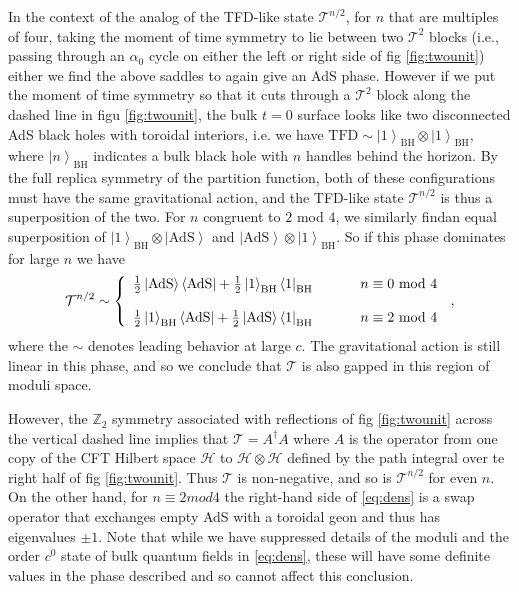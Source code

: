 \documentclass[letterpaper,12pt]{article}
\newcommand{\ban}[1]{\begin{align}#1\end{align}}
\newcommand{\ket}[1]{\left| #1\right>}
\newcommand{\bra}[1]{\left< #1\right|}
\begin{document}
In the context of the analog of the TFD-like state $\mathcal T^{n/2}$, for $n$ that are multiples of four, taking the moment of time symmetry to lie between two $\mathcal T^2$ blocks (i.e., passing through an $\alpha_0$ cycle on either the left or right side of fig \ref{fig:twounit}) either we find the above saddles to again give an AdS phase. However if we put the moment of time symmetry so that it cuts through a $\mathcal T^2$ block along the dashed line in figu \ref{fig:twounit}, the bulk $t=0$ surface looks like two disconnected AdS black holes with toroidal interiors, i.e. we have $\text{TFD} \sim \ket 1_\text{BH}\otimes \ket 1_\text{BH}$, where $\ket{n}_\text{BH}$ indicates a bulk black hole with $n$ handles behind the horizon. By the full replica symmetry of the partition function, both of these configurations must have the same gravitational action, and the TFD-like state $\mathcal T^{n/2}$ is thus a superposition of the two. For  $n$ congruent to $2$ mod $4$, we similarly findan equal superposition of $\ket 1_\text{BH} \otimes \ket{\text{AdS}}$ and $\ket{\text{AdS}}\otimes \ket 1_\text{BH} $. So if this phase dominates for large $n$ we have
\ban{
\mathcal T^{n/2}\sim \left \{ \begin{array}{ccc} \frac 12 \ket{\text{AdS}}\bra{\text{AdS}}+\frac 12 \ket 1 _\text{BH} \bra 1_\text{BH}& \hspace{0.5cm} & n \equiv 0 \text{ mod } 4 \\
\\
\frac 12 \ket{1}_\text{BH} \bra{\text{AdS}}+\frac 12 \ket{\text{AdS}} \bra 1_\text{BH} & \hspace{0.5cm}& n \equiv 2 \text{ mod } 4
\end{array}
 \right. \, \label{eq:dens},
}
where the $\sim$ denotes leading behavior at large $c$.
The gravitational action is still linear in this phase, and so we conclude that $\mathcal T$ is also gapped in this region of moduli space.

However, the ${\mathbb Z}_2$ symmetry associated with reflections of fig \ref{fig:twounit} across the vertical dashed line implies that ${\mathcal T} = A^\dagger A$ where $A$ is the operator from one copy of the CFT Hilbert space ${\mathcal H}$ to ${\mathcal H} \otimes {\mathcal H}$ defined by the path integral over te right half of fig \ref{fig:twounit}.  Thus $\mathcal T$ is non-negative, and so is ${\mathcal T}^{n/2}$ for even $n$. On the other hand, for $n \equiv 2 mod 4$ the right-hand side of \eqref{eq:dens} is a swap operator that exchanges empty AdS with a toroidal geon and thus has eigenvalues $\pm 1$.  Note that while we have suppressed details of the moduli and the order $c^0$ state of bulk quantum fields in \eqref{eq:dens}, these will have some definite values in the phase described and so cannot affect this conclusion.  
\end{document}
